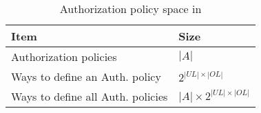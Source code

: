 \begin{table}
\centering
\caption{Authorization policy space in \labac{}}
\label{tab:policy-enumeration}
\begin{tabular}{|l|l|}
\hline
\textbf{Item}                                           & \textbf{Size}               \\ \hline
Authorization policies                   & $ |A|$                       \\ \hline
Ways to define an Auth. policy       & $2^ {|UL| \times |OL|}$             \\ \hline
Ways to define all Auth. policies & $  |A| \times 2^{|UL| \times |OL|}$ \\ \hline
\end{tabular}
\end{table}